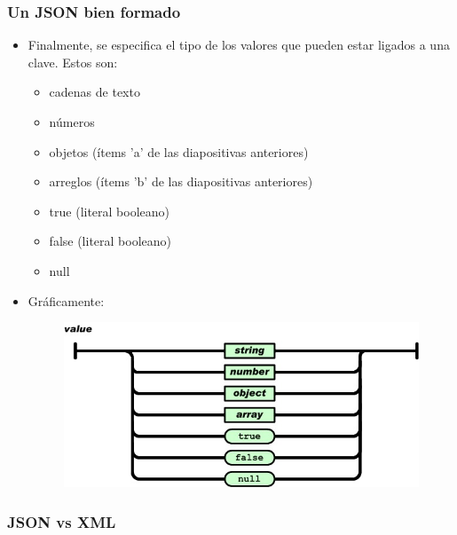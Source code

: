 \begin{frame}
\frametitle{Un JSON bien formado}
\begin{itemize}
\item	Finalmente, se especifica el tipo de los valores que pueden estar ligados a una clave. Estos son:
\begin{itemize}
	\item	cadenas de texto
	\item	números
	\item	objetos (ítems 'a' de las diapositivas anteriores)
	\item	arreglos (ítems 'b' de las diapositivas anteriores)
	\item	true (literal booleano)
	\item	false (literal booleano)
	\item	null
\end{itemize}
\pause
\item Gráficamente: \\
		\begin{figure}
		\includegraphics[scale=0.4]{JSONValue}
		\end{figure}
\end{itemize}
\end{frame}

\begin{frame}
\frametitle{JSON vs XML}
\end{frame}
